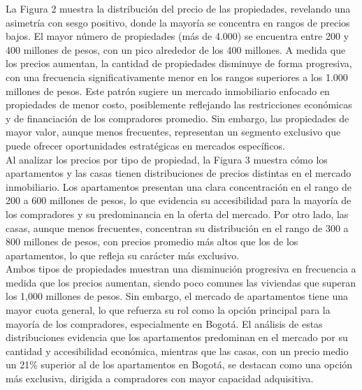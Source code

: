 \documentclass[a4paper]{article}
\theoremstyle{remark}
\theoremstyle{definition}
\begin{document}
La Figura 2 muestra la distribución del precio de las propiedades, revelando una asimetría con sesgo positivo, donde la mayoría se concentra en rangos de precios bajos. El mayor número de propiedades (más de 4.000) se encuentra entre 200 y 400 millones de pesos, con un pico alrededor de los 400 millones. A medida que los precios aumentan, la cantidad de propiedades disminuye de forma progresiva, con una frecuencia significativamente menor en los rangos superiores a los 1.000 millones de pesos.  Este patrón sugiere un mercado inmobiliario enfocado en propiedades de menor costo, posiblemente reflejando las restricciones económicas y de financiación de los compradores promedio. Sin embargo, las propiedades de mayor valor, aunque menos frecuentes, representan un segmento exclusivo que puede ofrecer oportunidades estratégicas en mercados específicos.\\

Al analizar los precios por tipo de propiedad, la Figura 3 muestra cómo los apartamentos y las casas tienen distribuciones de precios distintas en el mercado inmobiliario. Los apartamentos presentan una clara concentración en el rango de 200 a 600 millones de pesos, lo que evidencia su accesibilidad para la mayoría de los compradores y su predominancia en la oferta del mercado. Por otro lado, las casas, aunque menos frecuentes, concentran su distribución en el rango de 300 a 800 millones de pesos, con precios promedio más altos que los de los apartamentos, lo que refleja su carácter más exclusivo.\\

Ambos tipos de propiedades muestran una disminución progresiva en frecuencia a medida que los precios aumentan, siendo poco comunes las viviendas que superan los 1,000 millones de pesos. Sin embargo, el mercado de apartamentos tiene una mayor cuota general, lo que refuerza su rol como la opción principal para la mayoría de los compradores, especialmente en Bogotá. El análisis de estas distribuciones evidencia que los apartamentos predominan en el mercado por su cantidad y accesibilidad económica, mientras que las casas, con un precio medio un 21\% superior al de los apartamentos en Bogotá, se destacan como una opción más exclusiva, dirigida a compradores con mayor capacidad adquisitiva.
\end{document}
